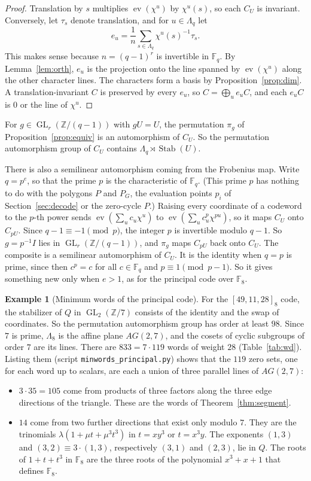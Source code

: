 \documentclass[12pt,letterpaper]{article}
\numberwithin{equation}{section}
\theoremstyle{definition}
\newtheorem{example}[theorem]{Example}
\theoremstyle{remark}
\DeclareMathOperator{\ev}{ev}
\DeclareMathOperator{\GL}{GL}
\newcommand{\F}{\mathbb{F}}
\newcommand{\Z}{\mathbb{Z}}
\newcommand{\Fq}{\mathbb{F}_q}
\newcommand{\Lq}{\Lambda_q}
\begin{document}
\begin{proof}
Translation by $s$ multiplies $\ev(\chi^u)$ by $\chi^u(s)$, so each $C_U$ is
invariant. Conversely, let $\tau_s$ denote translation, and for
$u\in\Lq$ let
\[
e_u=\frac{1}{n}\sum_{s\in\Lq}\chi^u(s)^{-1}\tau_s .
\]
This makes sense because $n=(q-1)^r$ is invertible in $\Fq$. By
Lemma~\ref{lem:orth}, $e_u$ is the projection onto the line spanned by
$\ev(\chi^u)$ along the other character lines. The characters form a basis
by Proposition~\ref{prop:dim}. A translation-invariant $C$ is preserved by
every $e_u$, so $C=\bigoplus_u e_uC$, and each $e_uC$ is $0$ or the line of
$\chi^u$.
\end{proof}

For $g\in\GL_r(\Z/(q-1))$ with $gU=U$, the permutation $\pi_g$ of
Proposition~\ref{prop:equiv} is an automorphism of $C_U$. So the permutation
automorphism group of $C_U$ contains $\Lq\rtimes\operatorname{Stab}(U)$.

There is also a semilinear automorphism coming from the Frobenius map. Write
$q=p^e$, so that the prime $p$ is the characteristic of $\Fq$. (This prime $p$
has nothing to do with the polygons $P$ and $P_G$, the evaluation points
$p_i$ of Section~\ref{sec:decode} or the zero-cycle $P$.) Raising every coordinate
of a codeword to the $p$-th power sends $\ev(\sum_uc_u\chi^u)$ to
$\ev(\sum_uc_u^p\chi^{pu})$, so it maps $C_U$ onto $C_{pU}$. Since
$q-1\equiv-1\pmod p$, the integer $p$ is invertible modulo $q-1$. So
$g=p^{-1}I$ lies in $\GL_r(\Z/(q-1))$, and $\pi_g$ maps $C_{pU}$ back onto
$C_U$. The composite is a semilinear automorphism of $C_U$. It is the
identity when $q=p$ is prime, since then $c^p=c$ for all $c\in\Fq$ and
$p\equiv1\pmod{p-1}$. So it gives something new only when $e>1$, as for the
principal code over $\F_8$.

\begin{example}[Minimum words of the principal code]\label{ex:minwords}
For the $[49,11,28]_8$ code, the stabilizer of $Q$ in $\GL_2(\Z/7)$ consists
of the identity and the swap of coordinates. So the permutation automorphism
group has order at least $98$. Since $7$ is prime, $\Lambda_8$ is the affine
plane $AG(2,7)$, and the cosets of cyclic subgroups of order $7$ are its
lines. There are $833=7\cdot119$ words of weight $28$
(Table~\ref{tab:wd}). Listing them (script \texttt{minwords\_principal.py})
shows that the $119$ zero sets, one for each word up to scalars, are each a
union of three parallel lines of $AG(2,7)$:
\begin{itemize}[leftmargin=*]
\item $3\cdot35=105$ come from products of three factors along the three
edge directions of the triangle. These are the words of
Theorem~\ref{thm:segment}.
\item $14$ come from two further directions that exist only modulo $7$. They
are the trinomials $\lambda(1+\mu t+\mu^3t^3)$ in $t=xy^3$ or $t=x^3y$. The
exponents $(1,3)$ and $(3,2)\equiv3\cdot(1,3)$, respectively $(3,1)$ and
$(2,3)$, lie in $Q$. The roots of $1+t+t^3$ in $\F_8$ are the three roots of
the polynomial $x^3+x+1$ that defines $\F_8$.
\end{itemize}
\end{example}
\end{document}
